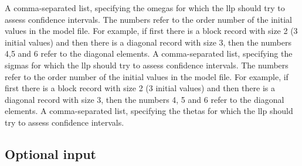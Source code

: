 \begin{optionlist}
A comma-separated list, specifying the omegas for which the llp should try to assess confidence intervals. The numbers refer to the order number of the initial values in the model file. For example, if first there is a block record with size 2 (3 initial values) and then there is a diagonal record with size 3, then the numbers 4,5 and 6 refer to the diagonal elements.
\nextopt
{}
A comma-separated list, specifying the sigmas for which the llp should try to assess confidence intervals. The numbers refer to the order number of the initial values in the model file. For example, if first there is a block record with size 2 (3 initial values) and then there is a diagonal record with size 3, then the numbers 4, 5 and 6 refer to the diagonal elements.
\nextopt
{}
A comma-separated list, specifying the thetas for which the llp should try to assess confidence intervals. 
\nextopt
\end{optionlist}

\subsection{Optional input}

